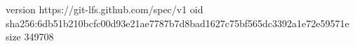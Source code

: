 version https://git-lfs.github.com/spec/v1
oid sha256:6db51b210bcfc00d93e21ae7787b7d8bad1627c75bf565dc3392a1e72e59571e
size 349708
